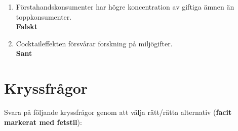 \documentclass{article}
\begin{document}
\begin{enumerate}[label=\arabic*.]
    \item Förstahandskonsumenter har högre koncentration av giftiga ämnen än toppkonsumenter.\\
    \textbf{Falskt}

    \item Cocktaileffekten försvårar forskning på miljögifter.\\
    \textbf{Sant}
\end{enumerate}

\break

\section*{Kryssfrågor}

Svara på följande kryssfrågor genom att välja rätt/rätta alternativ (\textbf{facit markerat med fetstil}):
\end{document}
